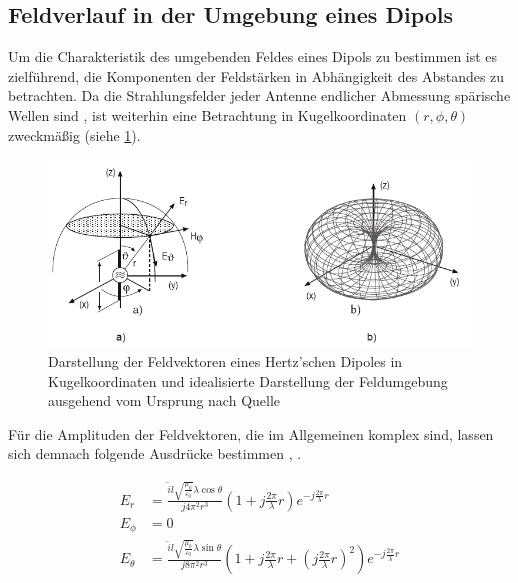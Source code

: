 \subsection{Feldverlauf in der Umgebung eines Dipols}\label{cha:2_sub_Feldverlauf_in_Umgebung_eines_Dipols}

Um die Charakteristik des umgebenden Feldes eines Dipols zu bestimmen ist es zielführend, die Komponenten der Feldstärken in Abhängigkeit des Abstandes zu betrachten. Da die Strahlungsfelder jeder Antenne endlicher Abmessung spärische Wellen sind \cite{Antenna_Theory}, ist weiterhin eine Betrachtung in Kugelkoordinaten $\left(r, \phi, \theta\right)$ zweckmäßig (siehe \Abb \ref{fig:2_Feldverlauf}). 

\begin{figure}
    \centering
    \includegraphics[width=.8\textwidth]{Abbildungen/Kapitel2/Feldverlauf.png}
    \caption[Darstellung der Feldvektoren eines Hertz'schen Dipoles und idealisierter Feldverlauf nach Quelle~\cite{EM_Schirmung}]{Darstellung der Feldvektoren eines Hertz'schen Dipoles in Kugelkoordinaten und idealisierte Darstellung der Feldumgebung ausgehend vom Ursprung nach Quelle~\cite{EM_Schirmung}}
    \label{fig:2_Feldverlauf}
\end{figure}

Für die Amplituden der Feldvektoren, die im Allgemeinen komplex sind, lassen sich demnach folgende Ausdrücke bestimmen \cite{Antenna_Theory}, \cite{EMV}.

\begin{subequations}
\label{eq:2_elektrische_Feldvektoren}
    \begin{align}
        E_r &= \frac{\hat i l \sqrt{\frac{\mu_0}{\varepsilon_0}} \lambda \cos{\theta}}{j 4 \pi^2 r^3}\left(1+ j\frac{2\pi}{\lambda}r\right)e^{-j\frac{2\pi}{\lambda}r} \label{subeq:2_E-Feld1} \\
        E_\phi &= 0 \label{subeq:2_E-Feld2} \\
        E_{\theta} &= \frac{\hat i l \sqrt{\frac{\mu_0}{\varepsilon_0}} \lambda \sin{\theta}}{j 8 \pi^2 r^3}\left(1+ j\frac{2\pi}{\lambda}r + \left(j\frac{2\pi}{\lambda}r\right)^2\right)e^{-j\frac{2\pi}{\lambda}r} \label{subeq:2_E-Feld3}
    \end{align}
\end{subequations}

